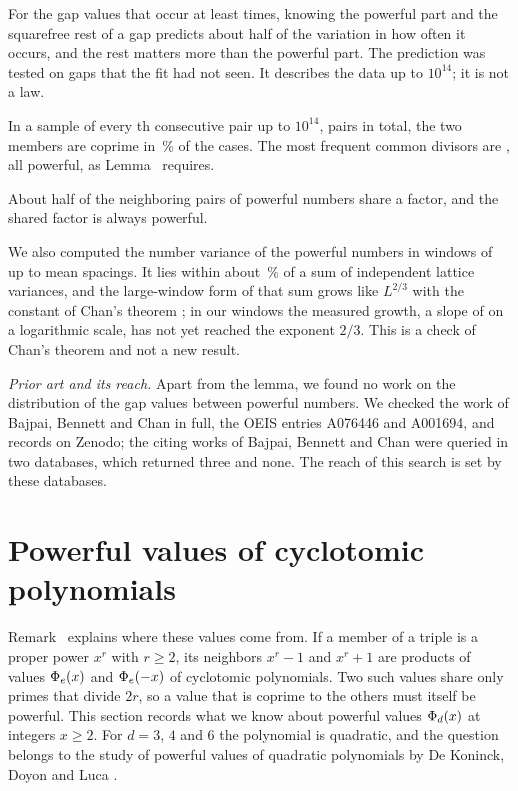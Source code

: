 \inwords For the gap values that occur at least  times, knowing the powerful part and the squarefree rest of a gap predicts about half
of the variation in how often it occurs, and the rest matters more than the powerful part. The prediction was tested on gaps that the fit
had not seen. It describes the data up to $10^{14}$; it is not a law.

\begin{remark}
In a sample of every th consecutive pair up to $10^{14}$,  pairs in total, the two members are coprime in
\,\% of the cases. The most frequent common divisors are , all powerful, as Lemma~ requires.
\end{remark}

\inwords About half of the neighboring pairs of powerful numbers share a factor, and the shared factor is always powerful.

We also computed the number variance of the powerful numbers in windows of up to  mean spacings. It lies within about
\,\% of a sum of independent lattice variances, and the large-window form of that sum grows like $L^{2/3}$ with the constant of
Chan's theorem \cite[Theorem~2]{Chan2026Variance}; in our windows the measured growth, a slope of  on a logarithmic scale, has not
yet reached the exponent $2/3$. This is a check of Chan's theorem and not a new result.

\emph{Prior art and its reach.} Apart from the lemma, we found no work on the distribution of the gap values between powerful numbers.
We checked the work of Bajpai, Bennett and Chan in full, the OEIS entries A076446 and A001694, and records on Zenodo; the citing works of
Bajpai, Bennett and Chan were queried in two databases, which returned three and none. The reach of this search is set by these databases.

\section{Powerful values of cyclotomic polynomials}

Remark~ explains where these values come from. If a member of a triple is a proper power $x^r$ with $r \ge 2$,
its neighbors $x^r - 1$ and $x^r + 1$ are products of values $\Phi_{e}(x)$ and $\Phi_{e}(-x)$ of cyclotomic polynomials. Two such values
share only primes that divide $2r$, so a value that is coprime to the others must itself be powerful. This section records what we know
about powerful values $\Phi_{d}(x)$ at integers $x \ge 2$. For $d = 3$, $4$ and $6$ the polynomial is quadratic, and the question belongs to
the study of powerful values of quadratic polynomials by De Koninck, Doyon and Luca \cite{DeKoninckDoyonLuca2011}.

